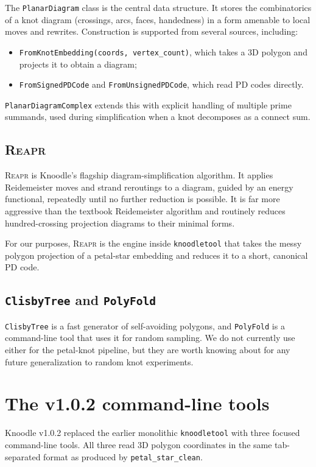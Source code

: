 \documentclass[11pt,oneside]{report}
\theoremstyle{definition}
\begin{document}
The \texttt{PlanarDiagram} class is the central data structure. It stores the
combinatorics of a knot diagram (crossings, arcs, faces, handedness) in a
form amenable to local moves and rewrites. Construction is supported from
several sources, including:
\begin{itemize}[leftmargin=2em]
\item \texttt{FromKnotEmbedding(coords, vertex\_count)}, which takes a 3D polygon
and projects it to obtain a diagram;
\item \texttt{FromSignedPDCode} and \texttt{FromUnsignedPDCode}, which read PD codes
directly.
\end{itemize}
\texttt{PlanarDiagramComplex} extends this with explicit handling of multiple
prime summands, used during simplification when a knot decomposes as a
connect sum.

\subsection{\textsc{Reapr}}

\textsc{Reapr} is Knoodle's flagship diagram-simplification algorithm. It
applies Reidemeister moves and strand reroutings to a diagram, guided by
an energy functional, repeatedly until no further reduction is possible.
It is far more aggressive than the textbook Reidemeister algorithm and
routinely reduces hundred-crossing projection diagrams to their minimal
forms.

For our purposes, \textsc{Reapr} is the engine inside \texttt{knoodletool}
that takes the messy polygon projection of a petal-star embedding and
reduces it to a short, canonical PD code.

\subsection{\texttt{ClisbyTree} and \texttt{PolyFold}}

\texttt{ClisbyTree} is a fast generator of self-avoiding polygons, and
\texttt{PolyFold} is a command-line tool that uses it for random sampling.
We do not currently use either for the petal-knot pipeline, but they are
worth knowing about for any future generalization to random knot
experiments.

\section{The v1.0.2 command-line tools}

Knoodle v1.0.2 replaced the earlier monolithic \texttt{knoodletool} with
three focused command-line tools. All three read 3D polygon coordinates in
the same tab-separated format as produced by \texttt{petal\_star\_clean}.
\end{document}
